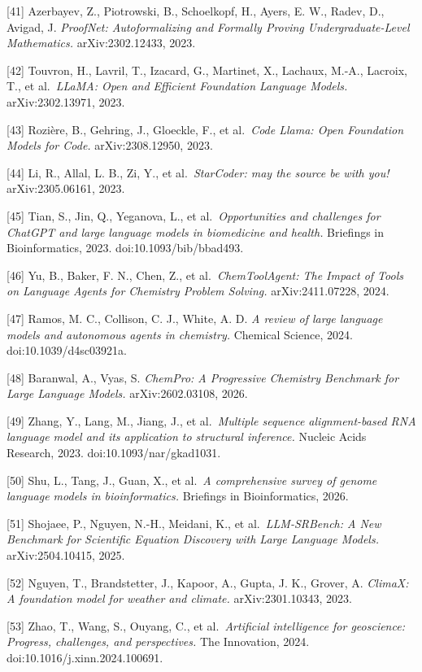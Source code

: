 {[}41{]} Azerbayev, Z., Piotrowski, B., Schoelkopf, H., Ayers, E. W., Radev, D., Avigad, J. \emph{ProofNet: Autoformalizing and Formally Proving Undergraduate-Level Mathematics.} arXiv:2302.12433, 2023.

{[}42{]} Touvron, H., Lavril, T., Izacard, G., Martinet, X., Lachaux, M.-A., Lacroix, T., et al.~\emph{LLaMA: Open and Efficient Foundation Language Models.} arXiv:2302.13971, 2023.

{[}43{]} Rozière, B., Gehring, J., Gloeckle, F., et al.~\emph{Code Llama: Open Foundation Models for Code.} arXiv:2308.12950, 2023.

{[}44{]} Li, R., Allal, L. B., Zi, Y., et al.~\emph{StarCoder: may the source be with you!} arXiv:2305.06161, 2023.

{[}45{]} Tian, S., Jin, Q., Yeganova, L., et al.~\emph{Opportunities and challenges for ChatGPT and large language models in biomedicine and health.} Briefings in Bioinformatics, 2023. doi:10.1093/bib/bbad493.

{[}46{]} Yu, B., Baker, F. N., Chen, Z., et al.~\emph{ChemToolAgent: The Impact of Tools on Language Agents for Chemistry Problem Solving.} arXiv:2411.07228, 2024.

{[}47{]} Ramos, M. C., Collison, C. J., White, A. D. \emph{A review of large language models and autonomous agents in chemistry.} Chemical Science, 2024. doi:10.1039/d4sc03921a.

{[}48{]} Baranwal, A., Vyas, S. \emph{ChemPro: A Progressive Chemistry Benchmark for Large Language Models.} arXiv:2602.03108, 2026.

{[}49{]} Zhang, Y., Lang, M., Jiang, J., et al.~\emph{Multiple sequence alignment-based RNA language model and its application to structural inference.} Nucleic Acids Research, 2023. doi:10.1093/nar/gkad1031.

{[}50{]} Shu, L., Tang, J., Guan, X., et al.~\emph{A comprehensive survey of genome language models in bioinformatics.} Briefings in Bioinformatics, 2026.

{[}51{]} Shojaee, P., Nguyen, N.-H., Meidani, K., et al.~\emph{LLM-SRBench: A New Benchmark for Scientific Equation Discovery with Large Language Models.} arXiv:2504.10415, 2025.

{[}52{]} Nguyen, T., Brandstetter, J., Kapoor, A., Gupta, J. K., Grover, A. \emph{ClimaX: A foundation model for weather and climate.} arXiv:2301.10343, 2023.

{[}53{]} Zhao, T., Wang, S., Ouyang, C., et al.~\emph{Artificial intelligence for geoscience: Progress, challenges, and perspectives.} The Innovation, 2024. doi:10.1016/j.xinn.2024.100691.

